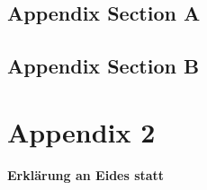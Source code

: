 \documentclass[11pt,a4paper,english,notitlepage]{report}
\begin{document}
\section{Appendix Section A}
\label{sec:appendix_1}

\section{Appendix Section B}
\label{sec:appendix_2}


\chapter{Appendix 2}
\label{chap:appendix_2}

\clearpage

{}



\clearpage

%
%
%

\thispagestyle{empty}
\label{erklaerung}

\setlength{\parindent}{0em}

\textbf{\large{Erklärung an Eides statt}}

 \vspace*{65pt}
 




\end{document}
